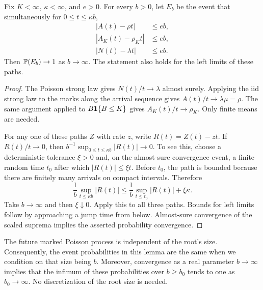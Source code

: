 \begin{lemma}\label{lem:uniform-lln}
Fix $K<\infty$, $\kappa<\infty$, and $e>0$. For every $b>0$, let $E_b$ be the event that simultaneously for $0\leq t\leq\kappa b$,
\begin{align}
 |A(t)-\rho t|&\leq eb,\label{eq:event-A}\\
 |A_K(t)-\rho_Kt|&\leq eb,\label{eq:event-AK}\\
 |N(t)-\lambda t|&\leq eb.\label{eq:event-N}
\end{align}
Then $\mathbb P(E_b)\to1$ as $b\to\infty$. The statement also holds for the left limits of these paths.
\end{lemma}
\begin{proof}
The Poisson strong law gives $N(t)/t\to\lambda$ almost surely. Applying the iid strong law to the marks along the arrival sequence gives $A(t)/t\to\lambda\mu=\rho$. The same argument applied to $B\mathbf 1\{B\leq K\}$ gives $A_K(t)/t\to\rho_K$. Only finite means are needed.

For any one of these paths $Z$ with rate $z$, write $R(t)=Z(t)-zt$. If $R(t)/t\to0$, then $b^{-1}\sup_{0\leq t\leq\kappa b}|R(t)|\to0$. To see this, choose a deterministic tolerance $\xi>0$ and, on the almost-sure convergence event, a finite random time $t_0$ after which $|R(t)|\leq\xi t$. Before $t_0$, the path is bounded because there are finitely many arrivals on compact intervals. Therefore
\[
 \frac1b\sup_{t\leq\kappa b}|R(t)|
 \leq\frac1b\sup_{t\leq t_0}|R(t)|+\xi\kappa.
\]
Take $b\to\infty$ and then $\xi\downarrow0$. Apply this to all three paths. Bounds for left limits follow by approaching a jump time from below. Almost-sure convergence of the scaled suprema implies the asserted probability convergence.
\end{proof}

The future marked Poisson process is independent of the root's size. Consequently, the event probabilities in this lemma are the same when we condition on that size being $b$. Moreover, convergence as a real parameter $b\to\infty$ implies that the infimum of these probabilities over $b\geq b_0$ tends to one as $b_0\to\infty$. No discretization of the root size is needed.

